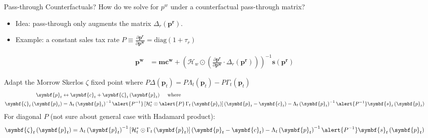 \begin{frame}{Pass-through Counterfactuals?}
\footnotesize
How do we solve for $p^w$ under a counterfactual pass-through matrix?
\begin{itemize}
\item Idea: pass-through only augments the matrix $\Delta_r(\symbf{p^r})$.
\item Example: a constant sales tax rate $P \equiv \frac{\partial \symbf{p^r}}{\partial \symbf{p^w}} = \text{diag}(1+\tau_r)$
\end{itemize}
\begin{align*}
\symbf{p^w}  &= \symbf{mc^w} + \left(\mathcal{H}_{w} \odot \left( \frac{\partial \symbf{p^r}}{\partial \symbf{p^w}} \cdot  \Delta_r(\symbf{p^r} ) \right) \right)^{-1} \symbf{s}(\symbf{p^r})
\end{align*}

Adapt the Morrow Skerlos $\zeta$ fixed point where $P \Delta(\symbf{p}_t) = P \Lambda_t\left(\symbf{p}_t\right)- P \Gamma_t\left(\symbf{p}_t\right)$
\begin{align*}
\symbf{p}_t &\leftrightarrow \symbf{c}_t+\symbf{\zeta}_t\left(\symbf{p}_t\right) \quad \text { where }\\
 \symbf{\zeta}_t\left(\symbf{p}_t\right)&=\Lambda_t\left(\symbf{p}_t\right)^{-1} \alert{P^{-1}}\left[\mathcal{H}_t^* \odot \alert{P}\, \Gamma_t\left(\symbf{p}_t\right)\right]\left(\symbf{p}_t-\symbf{c}_t\right)-\Lambda_t\left(\symbf{p}_t\right)^{-1} \alert{P^{-1}} \symbf{s}_t\left(\symbf{p}_t\right)
\end{align*}
For diagonal $P$ (not sure about general case with Hadamard product):
\begin{align*}
 \symbf{\zeta}_t\left(\symbf{p}_t\right)=\Lambda_t\left(\symbf{p}_t\right)^{-1}\left[\mathcal{H}_t^* \odot  \Gamma_t\left(\symbf{p}_t\right)\right]\left(\symbf{p}_t-\symbf{c}_t\right)-\Lambda_t\left(\symbf{p}_t\right)^{-1} \alert{P^{-1}} \symbf{s}_t\left(\symbf{p}_t\right)
\end{align*}
 
\end{frame}



